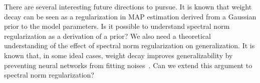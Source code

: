 There are several interesting future directions to pursue. It is known that weight decay can be seen as a regularization in MAP estimation derived from a Gaussian prior to the model parameters. Is it possible to understand spectral norm regularization as a derivation of a prior? We also need a theoretical understanding of the effect of spectral norm regularization on generalization. It is known that, in some ideal cases, weight decay improves generalizability by preventing neural networks from fitting noises~\cite{Krogh:1991uo}. Can we extend this argument to spectral norm regularization?


